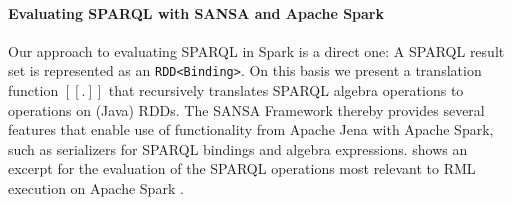 \paragraph{Evaluating SPARQL with SANSA and Apache Spark}
Our approach to evaluating SPARQL in Spark is a direct one: A SPARQL result set is represented as an \lstinline{RDD<Binding>}.
On this basis we present a translation function $[[.]]$ that recursively translates SPARQL algebra operations to operations on (Java) RDDs.
The SANSA Framework thereby provides several features that enable use of functionality from Apache Jena with Apache Spark, such as serializers for SPARQL bindings and algebra expressions.  shows an excerpt for the evaluation of the SPARQL operations most relevant to RML execution on Apache Spark .

